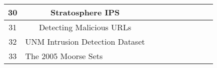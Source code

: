 \begin{landscape}
\begin{table*}[ht]
\begin{tabular}{|c|c|c|c|c|c|c|c|c|c|}
30 & Stratosphere IPS &  &  &  &  &  &  &  &  \\ \hline
31 & Detecting Malicious URLs &  &  &  &  &  &  &  &  \\ \hline
32 & \multicolumn{1}{l|}{UNM Intrusion Detection Dataset} & \multicolumn{1}{l|}{} & \multicolumn{1}{l|}{} & \multicolumn{1}{l|}{} & \multicolumn{1}{l|}{} & \multicolumn{1}{l|}{} & \multicolumn{1}{l|}{} & \multicolumn{1}{l|}{} & \multicolumn{1}{l|}{} \\ \hline
33 & \multicolumn{1}{l|}{The 2005 Moorse Sets} & \multicolumn{1}{l|}{} & \multicolumn{1}{l|}{} & \multicolumn{1}{l|}{} & \multicolumn{1}{l|}{} & \multicolumn{1}{l|}{} & \multicolumn{1}{l|}{} & \multicolumn{1}{l|}{} & \multicolumn{1}{l|}{} \\ \hline
\end{tabular}
\end{table*}
\end{landscape}